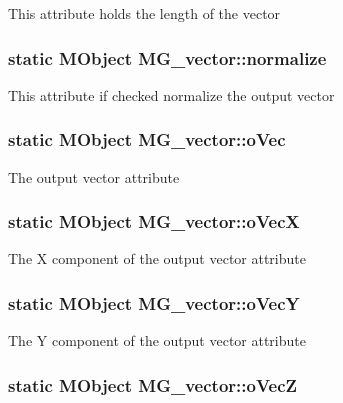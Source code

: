This attribute holds the length of the vector \hypertarget{class_m_g__vector_a0da85667dd839cd51882829a3c168a6c}{
\subsubsection[{normalize}]{\setlength{\rightskip}{0pt plus 5cm}static M\-Object M\-G\-\_\-vector\-::normalize\hspace{0.3cm}{\ttfamily [static]}}}\label{class_m_g__vector_a0da85667dd839cd51882829a3c168a6c}
This attribute if checked normalize the output vector \hypertarget{class_m_g__vector_a8e3c1d4392648a517a240e749e4acfd4}{
\subsubsection[{o\-Vec}]{\setlength{\rightskip}{0pt plus 5cm}static M\-Object M\-G\-\_\-vector\-::o\-Vec\hspace{0.3cm}{\ttfamily [static]}}}\label{class_m_g__vector_a8e3c1d4392648a517a240e749e4acfd4}
The output vector attribute \hypertarget{class_m_g__vector_ac3d4326cf87a24ff99a3a1e746997919}{
\subsubsection[{o\-Vec\-X}]{\setlength{\rightskip}{0pt plus 5cm}static M\-Object M\-G\-\_\-vector\-::o\-Vec\-X\hspace{0.3cm}{\ttfamily [static]}}}\label{class_m_g__vector_ac3d4326cf87a24ff99a3a1e746997919}
The X component of the output vector attribute \hypertarget{class_m_g__vector_a8b7f9011aa8c58993f9946dfc4b539df}{
\subsubsection[{o\-Vec\-Y}]{\setlength{\rightskip}{0pt plus 5cm}static M\-Object M\-G\-\_\-vector\-::o\-Vec\-Y\hspace{0.3cm}{\ttfamily [static]}}}\label{class_m_g__vector_a8b7f9011aa8c58993f9946dfc4b539df}
The Y component of the output vector attribute \hypertarget{class_m_g__vector_adcfd5002d7260461ba813c5e77668022}{
\subsubsection[{o\-Vec\-Z}]{\setlength{\rightskip}{0pt plus 5cm}static M\-Object M\-G\-\_\-vector\-::o\-Vec\-Z\hspace{0.3cm}{\ttfamily [static]}}}\label{class_m_g__vector_adcfd5002d7260461ba813c5e77668022}
